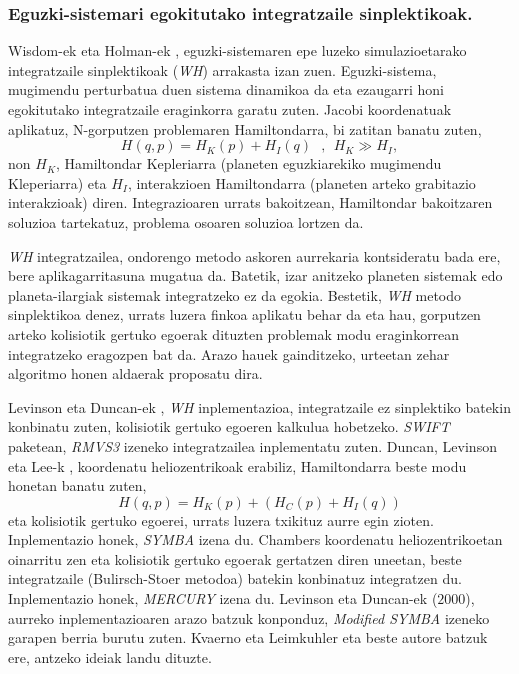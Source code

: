 \subsubsection*{Eguzki-sistemari egokitutako integratzaile sinplektikoak.}

Wisdom-ek eta Holman-ek \cite[1991]{Sussman1992}, eguzki-sistemaren epe luzeko simulazioetarako integratzaile  sinplektikoak (\emph{WH}) arrakasta izan zuen. Eguzki-sistema, mugimendu perturbatua duen sistema dinamikoa da eta ezaugarri honi egokitutako integratzaile eraginkorra garatu zuten. Jacobi koordenatuak  aplikatuz, N-gorputzen problemaren Hamiltondarra, bi zatitan banatu zuten,
\begin{equation*}
H(q,p)=H_K(p)+H_I(q) \ \ \ , \ \ H_K\gg H_I,
\end{equation*}
non $H_K$, Hamiltondar Kepleriarra (planeten eguzkiarekiko mugimendu Kleperiarra) eta $H_I$, interakzioen Hamiltondarra (planeten arteko grabitazio interakzioak) diren. Integrazioaren urrats bakoitzean, Hamiltondar bakoitzaren soluzioa tartekatuz, problema osoaren soluzioa lortzen da.  

\emph{WH} integratzailea, ondorengo metodo askoren aurrekaria kontsideratu bada ere, bere aplikagarritasuna mugatua da. Batetik, izar anitzeko planeten sistemak edo planeta-ilargiak sistemak integratzeko ez da egokia. Bestetik, \emph{WH} metodo sinplektikoa denez, urrats luzera finkoa aplikatu behar da eta hau, gorputzen arteko kolisiotik gertuko egoerak dituzten problemak modu eraginkorrean integratzeko eragozpen bat da. Arazo hauek gainditzeko, urteetan zehar algoritmo honen aldaerak proposatu dira. 

Levinson eta Duncan-ek \cite[1994]{Levison1994}, \emph{WH} inplementazioa, integratzaile ez sinplektiko batekin konbinatu zuten, kolisiotik gertuko egoeren kalkulua hobetzeko. \emph{SWIFT} paketean, \emph{RMVS3} izeneko integratzailea inplementatu zuten. Duncan, Levinson eta Lee-k \cite[1998]{Duncan1998}, koordenatu heliozentrikoak erabiliz, Hamiltondarra beste modu honetan banatu zuten,  
\begin{equation*}
H(q,p)=H_K(p)+(H_C(p)+H_I(q))
\end{equation*}
eta kolisiotik gertuko egoerei, urrats luzera txikituz aurre egin zioten. Inplementazio honek, \emph{SYMBA} izena du. Chambers \cite{Chambers1999} koordenatu heliozentrikoetan oinarritu zen eta kolisiotik gertuko egoerak gertatzen diren uneetan, beste integratzaile  (Bulirsch-Stoer metodoa) batekin konbinatuz integratzen du. Inplementazio honek, \emph{MERCURY} izena du. Levinson eta Duncan-ek ($2000$), aurreko inplementazioaren arazo batzuk konponduz, \emph{Modified SYMBA} izeneko garapen berria burutu zuten.
Kvaerno eta Leimkuhler \cite{Kvaerno2000} eta beste autore batzuk ere, antzeko ideiak landu dituzte.

